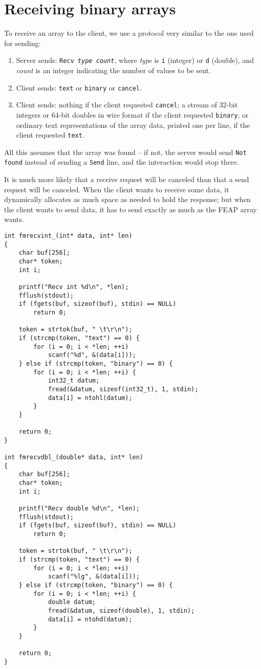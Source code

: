\section{Receiving binary arrays}

To receive an array to the client, we use a protocol very similar
to the one used for sending:
\begin{enumerate}
\item Server sends: {\tt Recv {\it type} {\it count}}, where
{\it type} is {\tt i} (integer) or {\tt d} (double), and
{\it count} is an integer indicating the number of values to
be sent.
\item Client sends: {\tt text} or {\tt binary} or {\tt cancel}.
\item Client sends: nothing if the client requested {\tt cancel}; a
stream of 32-bit integers or 64-bit doubles in wire format if the
client requested {\tt binary}; or ordinary text representations of
the array data, printed one per line, if the client requested
{\tt text}.
\end{enumerate}

All this assumes that the array was found -- if not, the server would
send {\tt Not found} instead of sending a {\tt Send} line, and the
interaction would stop there.

It is much more likely that a receive request will be canceled than
that a send request will be canceled.  When the client wants to receive
some data, it dynamically allocates as much space as needed to hold
the response; but when the client wants to send data, it has to send
exactly as much as the FEAP array wants.

\begin{verbatim}
int fmrecvint_(int* data, int* len)
{
    char buf[256];
    char* token;
    int i;

    printf("Recv int %d\n", *len);
    fflush(stdout);
    if (fgets(buf, sizeof(buf), stdin) == NULL)
        return 0;

    token = strtok(buf, " \t\r\n");
    if (strcmp(token, "text") == 0) {
        for (i = 0; i < *len; ++i)
            scanf("%d", &(data[i]));
    } else if (strcmp(token, "binary") == 0) {
        for (i = 0; i < *len; ++i) {
            int32_t datum;
            fread(&datum, sizeof(int32_t), 1, stdin);
            data[i] = ntohl(datum);
        }
    }

    return 0;
}

int fmrecvdbl_(double* data, int* len)
{
    char buf[256];
    char* token;
    int i;

    printf("Recv double %d\n", *len);
    fflush(stdout);
    if (fgets(buf, sizeof(buf), stdin) == NULL)
        return 0;

    token = strtok(buf, " \t\r\n");
    if (strcmp(token, "text") == 0) {
        for (i = 0; i < *len; ++i)
            scanf("%lg", &(data[i]));
    } else if (strcmp(token, "binary") == 0) {
        for (i = 0; i < *len; ++i) {
            double datum;
            fread(&datum, sizeof(double), 1, stdin);
            data[i] = ntohd(datum);
        }
    }

    return 0;
}

\end{verbatim}
